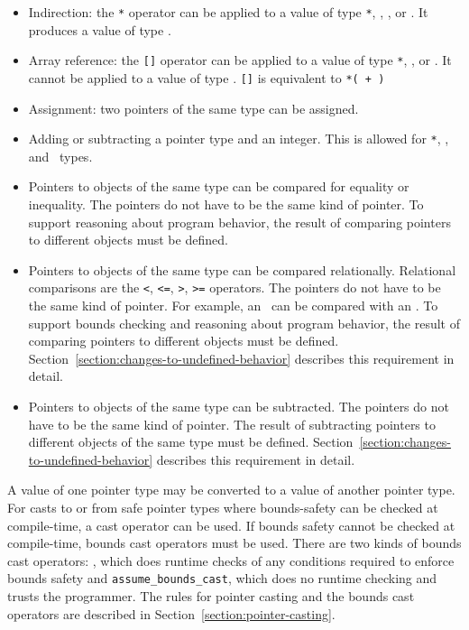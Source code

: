\begin{itemize}
\item
  Indirection: the \texttt{*} operator can be applied to a value of type
   \texttt{*},
  \ptrT,
  \arrayptrT, or
  \arrayviewT. It
  produces a value of type .
\item
  Array reference: the \texttt{[]} operator can be applied to a
  value of type  \texttt{*}, \arrayptrT, or \arrayviewT. It
  cannot be applied to a value of type \ptrT.
  \texttt{[]} is equivalent to
  \texttt{*( + )}
\item
  Assignment: two pointers of the same type can be assigned.
\item
  Adding or subtracting a pointer type and an integer. This is allowed
  for  \texttt{*}, \arrayptrT, and \arrayviewT\ types.
\item
  Pointers to objects of the same type can be compared for equality or
  inequality. The pointers do not have to be the same kind of pointer.
  To support reasoning about program behavior, the result of comparing
  pointers to different objects must be defined.
\item
  Pointers to objects of the same type can be compared relationally. Relational comparisons are the
  \verb|<|, \verb|<=|, \verb|>|, \verb|>=| operators. The pointers do not have to be
  the same kind of pointer. For example, an \unsafeptrT\ can be compared with an
  \arrayptrT . To support bounds checking and reasoning about program behavior, the
  result of comparing pointers to different objects must be defined.
  Section~\ref{section:changes-to-undefined-behavior} describes this requirement in detail.
\item
  Pointers to objects of the same type can be subtracted. The pointers do not have to be
  the same kind of
  pointer. The result of subtracting pointers to different objects of
  the same type must be defined. Section~\ref{section:changes-to-undefined-behavior}
  describes this requirement in detail.
\end{itemize}

A value of one pointer type may be converted to a value of another
pointer type. For casts to or from safe pointer types where
bounds-safety can be checked at compile-time, a cast operator can be
used. If bounds safety cannot be checked at compile-time, bounds cast
operators must be used. There are two kinds of bounds cast operators:
, which does runtime checks of any
conditions required to enforce bounds safety and
\texttt{assume\_bounds\_cast}, which does no runtime checking and
trusts the programmer. The rules for pointer casting and the bounds cast
operators are described in Section~\ref{section:pointer-casting}.

